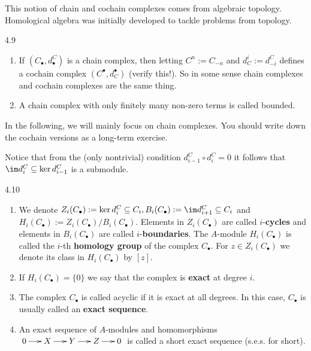 \documentclass[twoside = false,	%
		headsepline,		%
		parskip = true,
		]{scrbook}						%
\begin{document}
        This notion of chain and cochain complexes comes from algebraic topology. Homological algebra was initially developed to tackle problems from topology.

        \begin{remark}{}{4.9}
            \begin{enumerate}
                \item If $(C_\bullet,d_\bullet^C)$ is a chain complex, then letting $C^n:=C_{-n}$ and $d_C^i:=d_{-i}^C$ defines a cochain complex $(C^\bullet,d^\bullet_C)$ (verify this!). So in some sense chain complexes and cochain complexes are the same thing.
                \item A chain complex with only finitely many non-zero terms is called bounded.
            \end{enumerate}
        \end{remark}

        In the following, we will mainly focus on chain complexes. You should write down the cochain versions as a long-term exercise.

        Notice that from the (only nontrivial) condition $d_{i-1}^C \circ d_i^C = 0$ it follows that $\im d_i^C \subseteq \ker d_{i-1}^C$ is a submodule.

        \begin{definition}{}{4.10}
            \begin{enumerate}
                \item We denote $Z_i(C_\bullet):= \ker d_i^C \subseteq C_i, B_i(C_\bullet):=\im d_{i+1}^C \subseteq C_i$ and $H_i(C_\bullet):= Z_i(C_\bullet)/B_i(C_\bullet)$. Elements in $Z_i(C_\bullet)$ are called $i$-\textbf{cycles} and elements in $B_i(C_\bullet)$ are called $i$-\textbf{boundaries}. The $A$-module $H_i(C_\bullet)$ is called the $i$-th \textbf{homology group} of the complex $C_\bullet$. For $z \in Z_i(C_\bullet)$ we denote its class in $H_i(C_\bullet)$ by $[z]$.
                
                \item If $H_i(C_\bullet) = \{0\}$ we say that the complex is \textbf{exact} at degree $i$.
                
                \item The complex $C_\bullet$ is called acyclic if it is exact at all degrees. In this case, $C_\bullet$ is usually called an \textbf{exact sequence}.
    
                \item An exact sequence of $A$-modules and homomorphisms $\xymatrix@C=15pt{0 \ar[r] & X \ar[r] & Y \ar[r] & Z \ar[r] & 0}$ is called a short exact sequence (s.e.s. for short).
            \end{enumerate}
        \end{definition}
\end{document}
